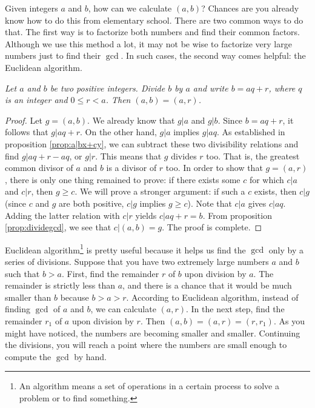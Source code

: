 \documentclass{subfile}
\begin{document}
	Given integers $a$ and $b$, how can we calculate $(a,b)$? Chances are you already know how to do this from elementary school. There are two common ways to do that. The first way is to factorize both numbers and find their common factors. Although we use this method a lot, it may not be wise to factorize very large numbers just to find their $\gcd$. In such cases, the second way comes helpful: the Euclidean algorithm.

	\begin{theorem}\slshape
		Let $a$ and $b$ be two positive integers. Divide $b$ by $a$ and write $b=aq+r$, where $q$ is an integer and $0\leq r<a$. Then $(a,b)=(a,r)$.
	\end{theorem}

	\begin{proof}
		Let $g= (a,b)$. We already know that $g|a$ and $g|b$. Since $b=aq+r$, it follows that $g|aq+r$. On the other hand, $g|a$ implies $g|aq$. As established in proposition \eqref{prop:a|bx+cy}, we can subtract these two divisibility relations and find $g|aq+r-aq$, or $g|r$. This means that $g$ divides $r$ too. That is, the greatest common divisor of $a$ and $b$ is a divisor of $r$ too. In order to show that $g=(a,r)$, there is only one thing remained to prove: if there exists some $c$ for which $c|a$ and $c|r$, then $g \geq c$. We will prove a stronger argument: if such a $c$ exists, then $c|g$ (since $c$ and $g$ are both positive, $c|g$ implies $g \geq c$). Note that $c|a$ gives $c|aq$. Adding the latter relation with $c|r$ yields $c|aq+r = b$. From proposition \eqref{prop:dividegcd}, we see that $c|(a,b)=g$. The proof is complete.
	\end{proof}

	Euclidean algorithm\footnote{An algorithm means a set of operations in a certain process to solve a problem or to find something.} is pretty useful because it helps us find the $\gcd$ only by a series of divisions. Suppose that you have two extremely large numbers $a$ and $b$ such that $b>a$. First, find the remainder $r$ of $b$ upon division by $a$. The remainder is strictly less than $a$, and there is a chance that it would be much smaller than $b$ because $b>a>r$. According to Euclidean algorithm, instead of finding $\gcd$ of $a$ and $b$, we can calculate $(a,r)$. In the next step, find the remainder $r_1$ of $a$ upon division by $r$. Then $(a,b)=(a,r)=(r,r_1)$. As you might have noticed, the numbers are becoming smaller and smaller. Continuing the divisions, you will reach a point where the numbers are small enough to compute the $\gcd$ by hand.
\end{document}
